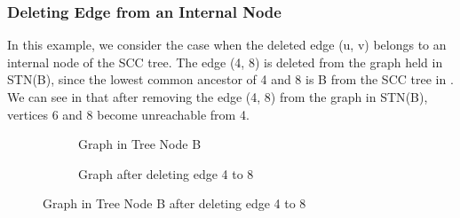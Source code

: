 \subsubsection{Deleting Edge from an Internal Node}\label{Subsubsec: Deleting Edge from an Internal Node}

In this example, we consider the case when the deleted edge (u, v) belongs to an internal node of the SCC tree.
The edge (4, 8) is deleted from the graph held in \textsc{STN}(B), since the lowest common ancestor of 4 and 8 is B from the SCC tree in \figureref{\ref{fig:scc_tree_graph1}}.
We can see in \figureref{\ref{fig:tree_node_b_graph_after_dedge1}} that after removing the edge (4, 8) from the graph in \textsc{STN}(B), vertices 6 and 8 become unreachable from 4.


\begin{figure}[H]
    \centering
    \begin{subfigure}{0.45\textwidth}
        \centering
        \caption{Graph in Tree Node B}
        \label{fig:tree_node_b_graph}
    \end{subfigure}
    \hfill
    \begin{subfigure}{0.45\textwidth}
        \centering
        \caption{Graph after deleting edge 4 to 8}
        \label{fig:graph_after_dedge_4_to_8}
    \end{subfigure}
    \caption{Graph in Tree Node B after deleting edge 4 to 8}
    \label{fig:tree_node_b_graph_after_dedge1}
\end{figure}

